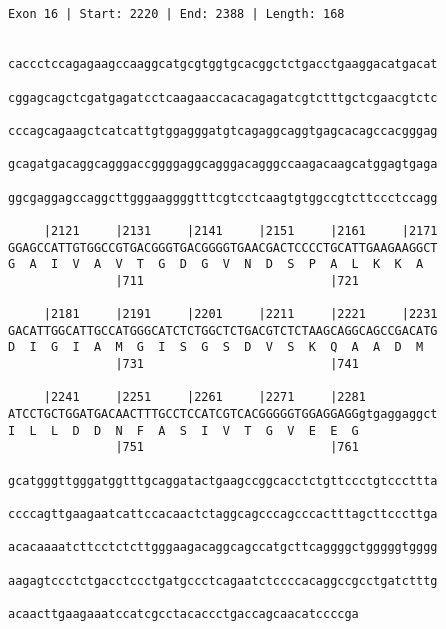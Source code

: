 \documentclass{article}
\begin{document}
\begin{Verbatim}
                               
 
Exon 16 | Start: 2220 | End: 2388 | Length: 168


caccctccagagaagccaaggcatgcgtggtgcacggctctgacctgaaggacatgacat
                                                            
cggagcagctcgatgagatcctcaagaaccacacagagatcgtctttgctcgaacgtctc
                                                            
cccagcagaagctcatcattgtggagggatgtcagaggcaggtgagcacagccacgggag
                                                            
gcagatgacaggcagggaccggggaggcagggacagggccaagacaagcatggagtgaga
                                                            
ggcgaggagccaggcttgggaaggggtttcgtcctcaagtgtggccgtcttccctccagg
                                                            
     |2121     |2131     |2141     |2151     |2161     |2171
GGAGCCATTGTGGCCGTGACGGGTGACGGGGTGAACGACTCCCCTGCATTGAAGAAGGCT
G  A  I  V  A  V  T  G  D  G  V  N  D  S  P  A  L  K  K  A  
               |711                          |721           
  
     |2181     |2191     |2201     |2211     |2221     |2231
GACATTGGCATTGCCATGGGCATCTCTGGCTCTGACGTCTCTAAGCAGGCAGCCGACATG
D  I  G  I  A  M  G  I  S  G  S  D  V  S  K  Q  A  A  D  M  
               |731                          |741           
  
     |2241     |2251     |2261     |2271     |2281          
ATCCTGCTGGATGACAACTTTGCCTCCATCGTCACGGGGGTGGAGGAGGgtgaggaggct
I  L  L  D  D  N  F  A  S  I  V  T  G  V  E  E  G           
               |751                          |761           
  
gcatgggttgggatggtttgcaggatactgaagccggcacctctgttccctgtcccttta
                                                            
ccccagttgaagaatcattccacaactctaggcagcccagcccactttagcttcccttga
                                                            
acacaaaatcttcctctcttgggaagacaggcagccatgcttcaggggctgggggtgggg
                                                            
aagagtccctctgacctccctgatgccctcagaatctccccacaggccgcctgatctttg
                                                            
acaacttgaagaaatccatcgcctacaccctgaccagcaacatccccga
                                                 

\end{Verbatim}
\end{document}
